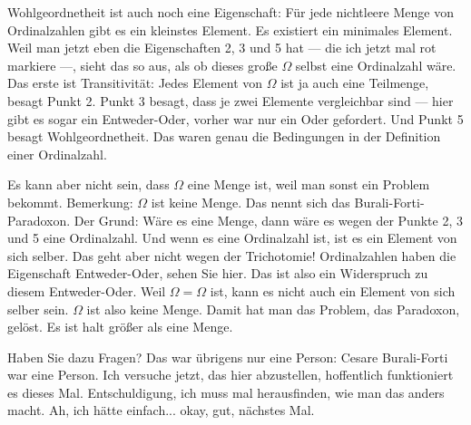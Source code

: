 \begin{spoken-clean}[00:37:50 - 00:39:25]
Wohlgeordnetheit ist auch noch eine Eigenschaft: Für jede nichtleere Menge von Ordinalzahlen gibt es ein kleinstes Element. Es existiert ein minimales Element. Weil man jetzt eben die Eigenschaften 2, 3 und 5 hat --- die ich jetzt mal rot markiere ---, sieht das so aus, als ob dieses große $\Omega$ selbst eine Ordinalzahl wäre. Das erste ist Transitivität: Jedes Element von $\Omega$ ist ja auch eine Teilmenge, besagt Punkt 2. Punkt 3 besagt, dass je zwei Elemente vergleichbar sind --- hier gibt es sogar ein Entweder-Oder, vorher war nur ein Oder gefordert. Und Punkt 5 besagt Wohlgeordnetheit. Das waren genau die Bedingungen in der Definition einer Ordinalzahl.

Es kann aber nicht sein, dass $\Omega$ eine Menge ist, weil man sonst ein Problem bekommt. Bemerkung: $\Omega$ ist keine Menge. Das nennt sich das Burali-Forti-Paradoxon. Der Grund: Wäre es eine Menge, dann wäre es wegen der Punkte 2, 3 und 5 eine Ordinalzahl. Und wenn es eine Ordinalzahl ist, ist es ein Element von sich selber. Das geht aber nicht wegen der Trichotomie! Ordinalzahlen haben die Eigenschaft Entweder-Oder, sehen Sie hier. Das ist also ein Widerspruch zu diesem Entweder-Oder. Weil $\Omega = \Omega$ ist, kann es nicht auch ein Element von sich selber sein. $\Omega$ ist also keine Menge. Damit hat man das Problem, das Paradoxon, gelöst. Es ist halt größer als eine Menge. 

Haben Sie dazu Fragen? Das war übrigens nur eine Person: Cesare Burali-Forti war eine Person. Ich versuche jetzt, das hier abzustellen, hoffentlich funktioniert es dieses Mal. Entschuldigung, ich muss mal herausfinden, wie man das anders macht. Ah, ich hätte einfach... okay, gut, nächstes Mal.
\end{spoken-clean}

